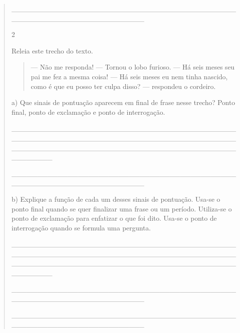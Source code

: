 \begin{boxlist}
\begin{quote}
\begin{iteize}
{\_\_\_\_\_\_\_\_\_\_\_\_\_\_\_\_\_\_\_\_\_\_\_\_\_\_\_\_\_\_\_\_\_\_\_\_\_\_\_\_\_\_\_\_\_\_\_\_\_\_\_\_\_\_\_\_\_\_\_\_\_\_\_\_\_\_\_\_\_\_

\num{2}

Releia este trecho do texto.

\begin{quote}
--- Não me responda! --- Tornou o lobo furioso.
--- Há seis meses seu pai me fez a mesma coisa!
--- Há seis meses eu nem tinha nascido, como é que eu posso ter culpa disso? --- respondeu o cordeiro.
\end{quote}

a) Que sinais de pontuação aparecem em final de frase nesse trecho? Ponto final,
ponto de exclamação e ponto de interrogação.

\protect\hypertarget{_Hlk127460239}{}{}\_\_\_\_\_\_\_\_\_\_\_\_\_\_\_\_\_\_\_\_\_\_\_\_\_\_\_\_\_\_\_\_\_\_\_\_\_\_\_\_\_\_\_\_\_\_\_\_\_\_\_\_\_\_\_\_\_\_\_\_\_\_\_\_\_\_\_\_\_\_\_\_\_\_\_\_\_\_\_\_\_\_\_\_\_\_\_\_\_\_\_\_\_\_\_\_\_\_\_\_\_\_\_\_\_\_\_\_\_\_\_\_\_\_\_\_\_\_\_\_\_\_\_\_\_\_\_\_\_\_\_\_\_\_\_\_\_\_\_\_

\_\_\_\_\_\_\_\_\_\_\_\_\_\_\_\_\_\_\_\_\_\_\_\_\_\_\_\_\_\_\_\_\_\_\_\_\_\_\_\_\_\_\_\_\_\_\_\_\_\_\_\_\_\_\_\_\_\_\_\_\_\_\_\_\_\_\_\_\_\_

b) Explique a função de cada um desses sinais de pontuação. Usa-se o
ponto final quando se quer finalizar uma frase ou um período. Utiliza-se
o ponto de exclamação para enfatizar o que foi dito. Usa-se o ponto de
interrogação quando se formula uma pergunta.


\_\_\_\_\_\_\_\_\_\_\_\_\_\_\_\_\_\_\_\_\_\_\_\_\_\_\_\_\_\_\_\_\_\_\_\_\_\_\_\_\_\_\_\_\_\_\_\_\_\_\_\_\_\_\_\_\_\_\_\_\_\_\_\_\_\_\_\_\_\_\_\_\_\_\_\_\_\_\_\_\_\_\_\_\_\_\_\_\_\_\_\_\_\_\_\_\_\_\_\_\_\_\_\_\_\_\_\_\_\_\_\_\_\_\_\_\_\_\_\_\_\_\_\_\_\_\_\_\_\_\_\_\_\_\_\_\_\_\_\_

\_\_\_\_\_\_\_\_\_\_\_\_\_\_\_\_\_\_\_\_\_\_\_\_\_\_\_\_\_\_\_\_\_\_\_\_\_\_\_\_\_\_\_\_\_\_\_\_\_\_\_\_\_\_\_\_\_\_\_\_\_\_\_\_\_\_\_\_\_\_

\_\_\_\_\_\_\_\_\_\_\_\_\_\_\_\_\_\_\_\_\_\_\_\_\_\_\_\_\_\_\_\_\_\_\_\_\_\_\_\_\_\_\_\_\_\_\_\_\_\_\_\_\_\_\_\_\_\_\_\_\_\_\_\_\_\_\_\_\_\_

}
\end{iteize}
\end{quote}
\end{boxlist}
